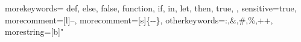 {
  morekeywords={
  	def,
    else,
    false,
    function,
    if,
    in,
    let,
    then,
    true,
  },
  sensitive=true, %
  morecomment=[l]{--}, %
  morecomment=[s]{\{-}{-\}}, %
  otherkeywords={:,\&,\#,\%,++},
  morestring=[b]" %
}
